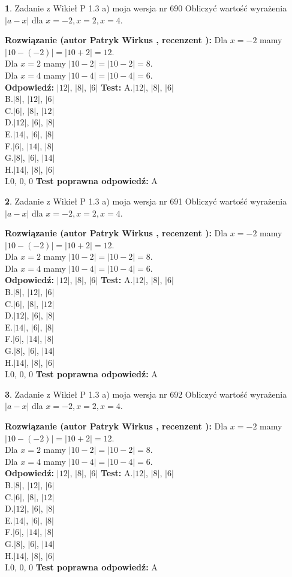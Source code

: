 \documentclass[12pt, a4paper]{article}
\theoremstyle{definition} %
\newtheorem{zad}{}
\newcommand{\zadStart}[1]{\begin{zad}#1\newline}
\newcommand{\zadStop}{\end{zad}}
\newcommand{\rozwStart}[2]{\noindent \textbf{Rozwiązanie (autor #1 , recenzent #2): }\newline}
\newcommand{\rozwStop}{\newline}
\newcommand{\odpStart}{\noindent \textbf{Odpowiedź:}\newline}
\newcommand{\odpStop}{\newline}
\newcommand{\testStart}{\noindent \textbf{Test:}\newline}
\newcommand{\testStop}{\newline}
\newcommand{\kluczStart}{\noindent \textbf{Test poprawna odpowiedź:}\newline}
\newcommand{\kluczStop}{\newline}
\begin{document}
\zadStart{Zadanie z Wikieł P 1.3 a) moja wersja nr 690}
Obliczyć wartość wyrażenia $|a - x|$ dla $x=-2,x=2,x=4$.
\zadStop
\rozwStart{Patryk Wirkus}{}
Dla $x = -2$ mamy $|10 - (-2)| = |10 + 2| = 12$.\\
Dla $x = 2$ mamy $|10 - 2| = |10 - 2| = 8$.\\
Dla $x = 4$ mamy $|10 - 4| = |10 - 4| = 6$.\\
\rozwStop
\odpStart
$|12|$, $|8|$, $|6|$
\odpStop
\testStart
A.$|12|$, $|8|$, $|6|$\\
B.$|8|$, $|12|$, $|6|$\\
C.$|6|$, $|8|$, $|12|$\\
D.$|12|$, $|6|$, $|8|$\\
E.$|14|$, $|6|$, $|8|$\\
F.$|6|$, $|14|$, $|8|$\\
G.$|8|$, $|6|$, $|14|$\\
H.$|14|$, $|8|$, $|6|$\\
I.$0$, $0$, $0$
\testStop
\kluczStart
A
\kluczStop



\zadStart{Zadanie z Wikieł P 1.3 a) moja wersja nr 691}
Obliczyć wartość wyrażenia $|a - x|$ dla $x=-2,x=2,x=4$.
\zadStop
\rozwStart{Patryk Wirkus}{}
Dla $x = -2$ mamy $|10 - (-2)| = |10 + 2| = 12$.\\
Dla $x = 2$ mamy $|10 - 2| = |10 - 2| = 8$.\\
Dla $x = 4$ mamy $|10 - 4| = |10 - 4| = 6$.\\
\rozwStop
\odpStart
$|12|$, $|8|$, $|6|$
\odpStop
\testStart
A.$|12|$, $|8|$, $|6|$\\
B.$|8|$, $|12|$, $|6|$\\
C.$|6|$, $|8|$, $|12|$\\
D.$|12|$, $|6|$, $|8|$\\
E.$|14|$, $|6|$, $|8|$\\
F.$|6|$, $|14|$, $|8|$\\
G.$|8|$, $|6|$, $|14|$\\
H.$|14|$, $|8|$, $|6|$\\
I.$0$, $0$, $0$
\testStop
\kluczStart
A
\kluczStop



\zadStart{Zadanie z Wikieł P 1.3 a) moja wersja nr 692}
Obliczyć wartość wyrażenia $|a - x|$ dla $x=-2,x=2,x=4$.
\zadStop
\rozwStart{Patryk Wirkus}{}
Dla $x = -2$ mamy $|10 - (-2)| = |10 + 2| = 12$.\\
Dla $x = 2$ mamy $|10 - 2| = |10 - 2| = 8$.\\
Dla $x = 4$ mamy $|10 - 4| = |10 - 4| = 6$.\\
\rozwStop
\odpStart
$|12|$, $|8|$, $|6|$
\odpStop
\testStart
A.$|12|$, $|8|$, $|6|$\\
B.$|8|$, $|12|$, $|6|$\\
C.$|6|$, $|8|$, $|12|$\\
D.$|12|$, $|6|$, $|8|$\\
E.$|14|$, $|6|$, $|8|$\\
F.$|6|$, $|14|$, $|8|$\\
G.$|8|$, $|6|$, $|14|$\\
H.$|14|$, $|8|$, $|6|$\\
I.$0$, $0$, $0$
\testStop
\kluczStart
A
\kluczStop
\end{document}
